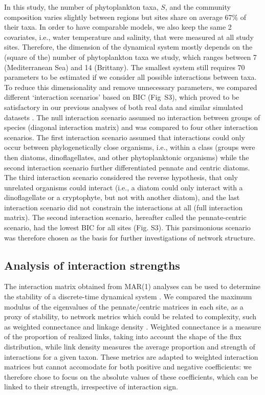 \documentclass[10pt]{article}
\begin{document}
In this study, the number of phytoplankton taxa, $S$, and the community
composition varies slightly between regions but sites share on average
67\% of their taxa. In order to have comparable models, we also keep
the same 2 covariates, i.e., water temperature and salinity, that
were measured at all study sites. Therefore, the dimension of the
dynamical system mostly depends on the (square of the) number of phytoplankton
taxa we study, which ranges between 7 (Mediterranean Sea) and 14 (Brittany).
The smallest system still requires 70 parameters to be estimated if
we consider all possible interactions between taxa. To reduce this
dimensionality and remove unnecessary parameters, we compared different
`interaction scenarios' based on BIC (Fig~S3), which proved to be
satisfactory in our previous analyses of both real data and similar
simulated datasets \citep{barraquand_coastal_2018}. The null interaction
scenario assumed no interaction between groups of species (diagonal
interaction matrix) and was compared to four other interaction scenarios.
The first interaction scenario assumed that interactions could only
occur between phylogenetically close organisms, i.e., within a class
(groups were then diatoms, dinoflagellates, and other phytoplanktonic
organisms) while the second interaction scenario further differentiated
pennate and centric diatoms. The third interaction scenario considered
the reverse hypothesis, that only unrelated organisms could interact
(i.e., a diatom could only interact with a dinoflagellate or a cryptophyte,
but not with another diatom), and the last interaction scenario did
not constrain the interactions at all (full interaction matrix). The
second interaction scenario, hereafter called the pennate-centric
scenario, had the lowest BIC for all sites (Fig. S3). This parsimonious
scenario was therefore chosen as the basis for further investigations
of network structure.

\subsection*{Analysis of interaction strengths}

The interaction matrix obtained from MAR(1) analyses can be used to
determine the stability of a discrete-time dynamical system \citep{ives_estimating_2003}.
We compared the maximum modulus of the eigenvalues of the pennate/centric
matrices in each site, as a proxy of stability, to network metrics
which could be related to complexity, such as weighted connectance
and linkage density \citep{bersier_quantitative_2002}. Weighted connectance
is a measure of the proportion of realized links, taking into account
the shape of the flux distribution, while link density measures the
average proportion and strength of interactions for a given taxon.
These metrics are adapted to weighted interaction matrices but cannot
accomodate for both positive and negative coefficients: we therefore
chose to focus on the absolute values of these coefficients, which
can be linked to their strength, irrespective of interaction sign.
\end{document}
